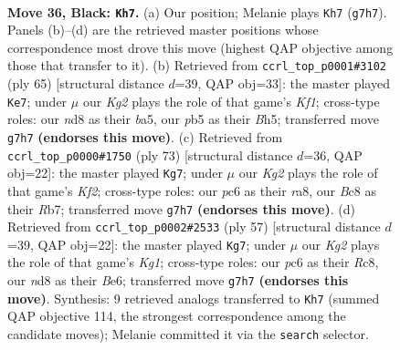 \documentclass[11pt]{article}
\begin{document}
\clearpage

\begin{figure}[p]\centering
\begin{subfigure}{0.46\textwidth}\centering
\resizebox{\linewidth}{!}{%
\newchessgame
\chessboard[
  setfen={r1bN4/p5k1/2P1p3/PPnp4/5B2/2P5/5K2/R7 b - - 2 36},
  showmover=false,
  pgfstyle=straightmove, color=movearrow, markmove={g7-h7}
]}
\caption{}
\end{subfigure}\hfill
\begin{subfigure}{0.46\textwidth}\centering
\resizebox{\linewidth}{!}{%
\newchessgame
\chessboard[
  setfen={5k2/2p2p2/2P4p/B3n1pb/3N4/6P1/1PP5/6K1 b - - 2 33},
  showmover=false,
  pgfstyle=straightmove, color=movearrow, markmove={f8-e7}
]}
\caption{}
\end{subfigure}
\\[4pt]
\begin{subfigure}{0.46\textwidth}\centering
\resizebox{\linewidth}{!}{%
\newchessgame
\chessboard[
  setfen={R7/1r1bnk1p/5p2/1p1p4/3N1P2/6P1/5K1P/1B6 b - - 7 37},
  showmover=false,
  pgfstyle=straightmove, color=movearrow, markmove={f7-g7}
]}
\caption{}
\end{subfigure}\hfill
\begin{subfigure}{0.46\textwidth}\centering
\resizebox{\linewidth}{!}{%
\newchessgame
\chessboard[
  setfen={2r3k1/5p2/4b1p1/R3P3/5PP1/2p4P/5K2/2B5 b - - 0 29},
  showmover=false,
  pgfstyle=straightmove, color=movearrow, markmove={g8-g7}
]}
\caption{}
\end{subfigure}
\caption{\textbf{Move 36, Black: \texttt{Kh7}.} (a) Our position; Melanie plays \texttt{Kh7} (\texttt{g7h7}). Panels (b)--(d) are the retrieved master positions whose correspondence most drove this move (highest QAP objective among those that transfer to it). (b) Retrieved from \texttt{ccrl\_top\_p0001\#3102} (ply 65) [structural distance $d$=39, QAP obj=33]: the master played \texttt{Ke7}; under $\mu$ our \emph{Kg2} plays the role of that game's \emph{Kf1}; cross-type roles: our \emph{n}d8 as their \emph{b}a5, our \emph{p}b5 as their \emph{B}h5; transferred move \texttt{g7h7} \textbf{(endorses this move)}. (c) Retrieved from \texttt{ccrl\_top\_p0000\#1750} (ply 73) [structural distance $d$=36, QAP obj=22]: the master played \texttt{Kg7}; under $\mu$ our \emph{Kg2} plays the role of that game's \emph{Kf2}; cross-type roles: our \emph{p}c6 as their \emph{r}a8, our \emph{B}c8 as their \emph{R}b7; transferred move \texttt{g7h7} \textbf{(endorses this move)}. (d) Retrieved from \texttt{ccrl\_top\_p0002\#2533} (ply 57) [structural distance $d$=39, QAP obj=22]: the master played \texttt{Kg7}; under $\mu$ our \emph{Kg2} plays the role of that game's \emph{Kg1}; cross-type roles: our \emph{p}c6 as their \emph{R}c8, our \emph{n}d8 as their \emph{B}e6; transferred move \texttt{g7h7} \textbf{(endorses this move)}. Synthesis: 9 retrieved analogs transferred to \texttt{Kh7} (summed QAP objective 114, the strongest correspondence among the candidate moves); Melanie committed it via the \texttt{search} selector.}
\label{fig:thought-m71}
\end{figure}
\end{document}
